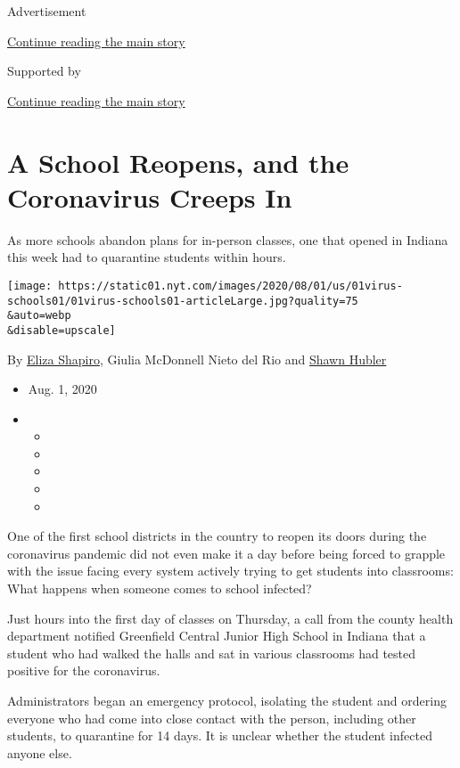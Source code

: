 Advertisement

\protect\hyperlink{after-top}{Continue reading the main story}

Supported by

\protect\hyperlink{after-sponsor}{Continue reading the main story}

\hypertarget{a-school-reopens-and-the-coronavirus-creeps-in}{%
\section{A School Reopens, and the Coronavirus Creeps
In}\label{a-school-reopens-and-the-coronavirus-creeps-in}}

As more schools abandon plans for in-person classes, one that opened in
Indiana this week had to quarantine students within hours.

\texttt{[image: https://static01.nyt.com/images/2020/08/01/us/01virus-schools01/01virus-schools01-articleLarge.jpg?quality=75\\\&auto=webp\\\&disable=upscale]}

By \href{https://www.nytimes.com/by/eliza-shapiro}{Eliza Shapiro},
Giulia McDonnell Nieto del Rio and
\href{https://www.nytimes.com/by/shawn-hubler}{Shawn Hubler}

\begin{itemize}
\item
  Aug. 1, 2020
\item
  \begin{itemize}
  \item
  \item
  \item
  \item
  \item
  \end{itemize}
\end{itemize}

One of the first school districts in the country to reopen its doors
during the coronavirus pandemic did not even make it a day before being
forced to grapple with the issue facing every system actively trying to
get students into classrooms: What happens when someone comes to school
infected?

Just hours into the first day of classes on Thursday, a call from the
county health department notified Greenfield Central Junior High School
in Indiana that a student who had walked the halls and sat in various
classrooms had tested positive for the coronavirus.

Administrators began an emergency protocol, isolating the student and
ordering everyone who had come into close contact with the person,
including other students, to quarantine for 14 days. It is unclear
whether the student infected anyone else.

